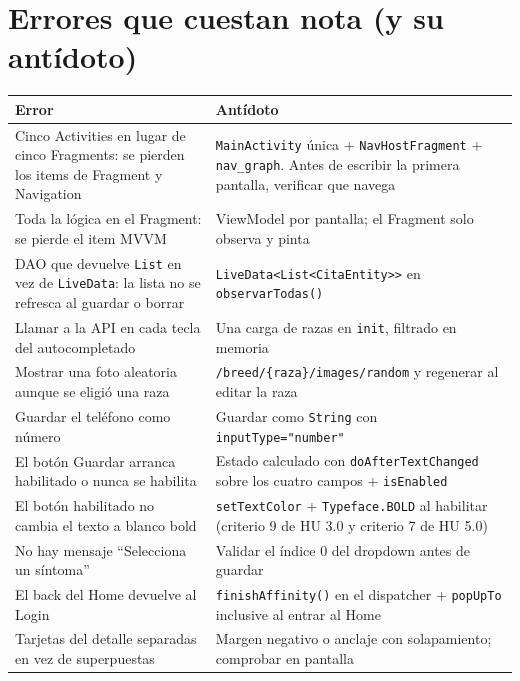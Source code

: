 \documentclass[11pt,letterpaper]{article}
\newcommand{\code}[1]{\texttt{\small #1}}
\begin{document}
\section{Errores que cuestan nota (y su ant\'idoto)}

\begin{center}
\small
\begin{xltabular}{\linewidth}{@{}X X@{}}
\toprule
\textbf{Error} & \textbf{Ant\'idoto}\\
\midrule
\endhead
\bottomrule
\endlastfoot
Cinco Activities en lugar de cinco Fragments: se pierden los items de Fragment y Navigation & \code{MainActivity} \'unica + \code{NavHostFragment} + \code{nav\_graph}. Antes de escribir la primera pantalla, verificar que navega\\
Toda la l\'ogica en el Fragment: se pierde el item MVVM & ViewModel por pantalla; el Fragment solo observa y pinta\\
DAO que devuelve \code{List} en vez de \code{LiveData}: la lista no se refresca al guardar o borrar & \code{LiveData<List<CitaEntity>>} en \code{observarTodas(\allowbreak{})}\\
Llamar a la API en cada tecla del autocompletado & Una carga de razas en \code{init}, filtrado en memoria\\
Mostrar una foto aleatoria aunque se eligi\'o una raza & \code{/breed/\{raza\}/\allowbreak{}images/\allowbreak{}random} y regenerar al editar la raza\\
Guardar el tel\'efono como n\'umero & Guardar como \code{String} con \code{inputType=\allowbreak{}"number"}\\
El bot\'on Guardar arranca habilitado o nunca se habilita & Estado calculado con \code{doAfterTextChanged} sobre los cuatro campos + \code{isEnabled}\\
El bot\'on habilitado no cambia el texto a blanco bold & \code{setTextColor} + \code{Typeface.\allowbreak{}BOLD} al habilitar (criterio 9 de HU 3.0 y criterio 7 de HU 5.0)\\
No hay mensaje ``Selecciona un s\'intoma'' & Validar el \'indice 0 del dropdown antes de guardar\\
El back del Home devuelve al Login & \code{finishAffinity(\allowbreak{})} en el dispatcher + \code{popUpTo} inclusive al entrar al Home\\
Tarjetas del detalle separadas en vez de superpuestas & Margen negativo o anclaje con solapamiento; comprobar en pantalla\\

\end{xltabular}
\end{center}
\end{document}
